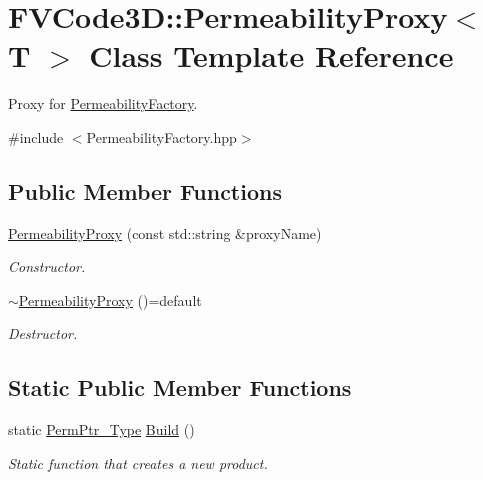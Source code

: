 \hypertarget{classFVCode3D_1_1PermeabilityProxy}{}\section{F\+V\+Code3D\+:\+:Permeability\+Proxy$<$ T $>$ Class Template Reference}
\label{classFVCode3D_1_1PermeabilityProxy}


Proxy for \hyperlink{classFVCode3D_1_1PermeabilityFactory}{Permeability\+Factory}.  




{\ttfamily \#include $<$Permeability\+Factory.\+hpp$>$}

\subsection*{Public Member Functions}
\begin{DoxyCompactItemize}
\item 
\hyperlink{classFVCode3D_1_1PermeabilityProxy_ad32fd95d4858deec225f041a7e4cbfc1}{Permeability\+Proxy} (const std\+::string \&proxy\+Name)
\begin{DoxyCompactList}\small\item\em Constructor. \end{DoxyCompactList}\item 
\hyperlink{classFVCode3D_1_1PermeabilityProxy_aad6ecd6098980d18c150057631b9fa08}{$\sim$\+Permeability\+Proxy} ()=default
\begin{DoxyCompactList}\small\item\em Destructor. \end{DoxyCompactList}\end{DoxyCompactItemize}
\subsection*{Static Public Member Functions}
\begin{DoxyCompactItemize}
\item 
static \hyperlink{namespaceFVCode3D_aee5ae48a57366603109f90f526a645b1}{Perm\+Ptr\+\_\+\+Type} \hyperlink{classFVCode3D_1_1PermeabilityProxy_aa5d0847371daa4a99c080e7ba317d965}{Build} ()
\begin{DoxyCompactList}\small\item\em Static function that creates a new product. \end{DoxyCompactList}\end{DoxyCompactItemize}
